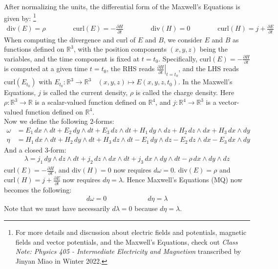 \documentclass[11pt,oneside]{book}
\theoremstyle{break}
\theoremstyle{break}
\newcommand{\R}{\mathbb{R}}
\begin{document}
After normalizing the units, the differential form of the Maxwell's Equations is given by: \footnote{For more details and discussion about electric fields and potentials, magnetic fields and vector potentials, and the Maxwell's Equations, check out \textit{Class Note: Physics 405 - Intermediate Electricity and Magnetism} transcribed by Jinyan Miao in Winter 2022.}
\begin{align*}
\text{div}(E)= \rho \qquad\qquad \text{curl}(E) = -\frac{\partial H}{\partial t} \qquad\qquad \text{div}(H) = 0 \qquad\qquad \text{curl}(H) = j + \frac{\partial E}{\partial t} \tag{MQ}
\end{align*}
When computing the divergence and curl of $E$ and $B$, we consider $E$ and $B$ as functions defined on $\R^3$, with the position components $(x,y,z)$ being the variables, and the time component is fixed at $t= t_0$. Specifically, $ \text{curl}(E) = -\frac{\partial H}{\partial t} $ is computed at a given time $t = t_0$, the RHS reads $\left.\frac{\partial H}{\partial t}\right|_{t = t_0}$, and the LHS reads $\text{curl}(E_{t_0})$ with $E_{t_0}:\R^3 \to \R^3 \ \ \ \ (x,y,z)\mapsto E(x,y,z,t_0)$. In the Maxwell's Equations, $j$ is called the current density, $\rho$ is called the charge density. Here $\rho:\R^3 \to \R$ is a scalar-valued function defined on $\R^4$, and $j:\R^4 \to \R^3$ is a vector-valued function defined on $\R^4$. \\

Now we define the following $2$-forms:
\begin{align*}
\omega&= E_1\, dx\wedge dt + E_2\, dy\wedge dt + E_3\, dz\wedge dt + H_1\, dy\wedge dz+ H_2\, dz\wedge dx + H_3\, dx\wedge dy\\
\eta &= H_1\, dx \wedge dt + H_2\, dy \wedge dt + H_3\, dz \wedge dt - E_1\, dy \wedge dz - E_2\, dz\wedge dx - E_3 \, dx \wedge dy \tag{WN}
\end{align*}
And a closed $3$-form: 
\begin{align*}
\lambda = j_1\, dy \wedge dz \wedge dt + j_2\, dz \wedge dx \wedge dt + j_3\, dx \wedge dy \wedge dt - \rho\, dx \wedge dy \wedge dz \tag{WN}
\end{align*}
$\text{curl}(E) = -\frac{\partial H}{\partial t}$, and $\text{div}(H) = 0$ now requires $d\omega = 0$. $\text{div}(E) = \rho$ and $\text{curl}(H) = j +\frac{\partial E}{\partial t}$ now requires $d\eta = \lambda$. Hence Maxwell's Equations (MQ) now becomes the following:
\begin{align*}
d\omega  = 0\qquad\qquad\qquad d\eta = \lambda \tag{MQ}
\end{align*}
Note that we must have necessarily $d\lambda = 0$ because $d\eta = \lambda$. \\
\end{document}

